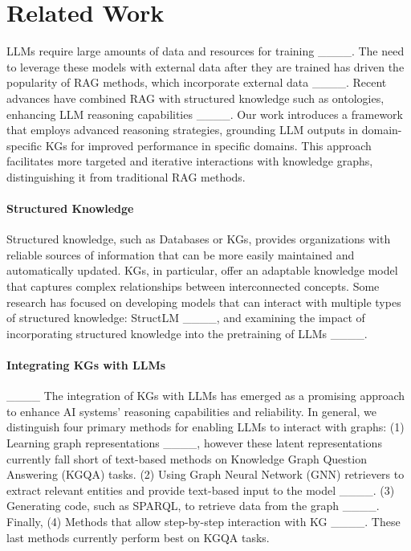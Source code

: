 \section{Related Work}

LLMs require large amounts of data and resources for training ____. The need to leverage these models with external data after they are trained has driven the popularity of RAG methods, which incorporate external data ____. Recent advances have combined RAG with structured knowledge such as ontologies, enhancing LLM reasoning capabilities ____. Our work introduces a framework that employs advanced reasoning strategies, grounding LLM outputs in domain-specific KGs for improved performance in specific domains.  This approach facilitates more targeted and iterative interactions with knowledge graphs, distinguishing it from traditional RAG methods.

\paragraph{Structured Knowledge} Structured knowledge, such as Databases or KGs, provides organizations with reliable sources of information that can be more easily maintained and automatically updated. KGs, in particular, offer an adaptable knowledge model that captures complex relationships between interconnected concepts. Some research has focused on developing models that can interact with multiple types of structured knowledge: StructLM  ____, and examining the impact of incorporating structured knowledge into the pretraining of LLMs  ____. 


\paragraph{Integrating KGs with LLMs} ____ The integration of KGs with LLMs has emerged as a promising approach to enhance AI systems' reasoning capabilities and reliability. In general, we distinguish four primary methods for enabling LLMs to interact with graphs: (1) Learning graph representations ____, however these latent representations currently fall short of text-based methods on Knowledge Graph Question Answering (KGQA) tasks. (2) Using Graph Neural Network (GNN) retrievers to extract relevant entities and provide text-based input to the model ____. (3) Generating code, such as SPARQL, to retrieve data from the graph ____. Finally, (4) Methods that allow step-by-step interaction with KG ____. These last methods currently perform best on KGQA tasks.

